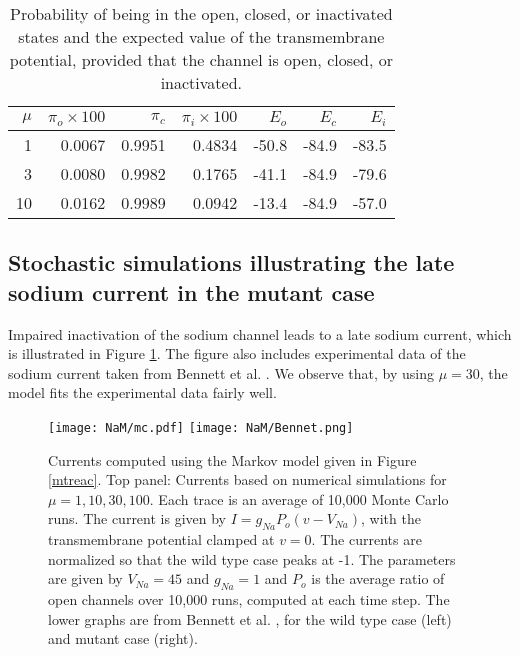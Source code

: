 \begin{table}  \begin{center}
\begin{tabular}{|r|r|r|r|r|r|r|} \hline
$\mu$ & $\pi_o\times 100 $ & $\pi_c$ & $\pi_i\times 100$ & $E_o$ & $E_c$ & $E_i$ \\ \hline
1 & 0.0067 & 0.9951 & 0.4834 & -50.8 & -84.9 & -83.5 \\ \hline
3 & 0.0080 & 0.9982 & 0.1765 & -41.1 & -84.9 & -79.6 \\ \hline
10 & 0.0162 & 0.9989 & 0.0942 & -13.4 & -84.9 & -57.0 \\ \hline
\end{tabular} \end{center}
\caption{Probability of being in the open, closed, or inactivated states and the expected value of the transmembrane
potential, provided that the channel is open, closed, or inactivated.}
\label{na_stat}
\end{table}




\subsection{Stochastic simulations illustrating the late sodium current in the mutant case}


Impaired inactivation of the sodium channel leads to a late sodium current,
which is illustrated in Figure \ref{NaM/mc.pdf}. The figure also includes 
experimental data of the sodium current taken from Bennett et al. 
\cite{Bennett1995}. We observe that, by
using $\mu=30$, the model fits the experimental data fairly well.


\begin{figure}[p]\centering
\vbox{
\texttt{[image: NaM/mc.pdf]}
\texttt{[image: NaM/Bennet.png]}
}
\caption{Currents computed using the Markov model given in Figure \ref{mtreac}. Top panel: Currents based on numerical simulations for  $\mu=1,10,30,100$. Each trace is an average of 10,000 Monte Carlo runs. The current is given by $I=g_{Na} P_o (v-V_{Na})$, with the transmembrane potential clamped at $v=0$. The currents are normalized so that the wild type case peaks at -1. The parameters are given by $V_{Na} = 45$ and $g_{Na} = 1$ and $P_o$ is the average ratio of open channels over 10,000 runs, computed at each time step. The lower graphs are from Bennett et al. \cite{Bennett1995}, for the wild type case (left) and mutant case (right). 
\label{NaM/mc.pdf} }
\end{figure}

